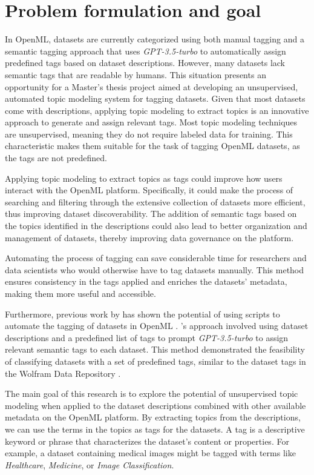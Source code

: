 \section{Problem formulation and goal}
In OpenML, datasets are currently categorized using both manual tagging and a semantic tagging approach that uses \textit{GPT-3.5-turbo} to automatically assign predefined tags based on dataset descriptions. However, many datasets lack semantic tags that are readable by humans. This situation presents an opportunity for a Master's thesis project aimed at developing an unsupervised, automated topic modeling system for tagging datasets. Given that most datasets come with descriptions, applying topic modeling to extract topics is an innovative approach to generate and assign relevant tags. Most topic modeling techniques are unsupervised, meaning they do not require labeled data for training. This characteristic makes them suitable for the task of tagging OpenML datasets, as the tags are not predefined.

Applying topic modeling to extract topics as tags could improve how users interact with the OpenML platform. Specifically, it could make the process of searching and filtering through the extensive collection of datasets more efficient, thus improving dataset discoverability. The addition of semantic tags based on the topics identified in the descriptions could also lead to better organization and management of datasets, thereby improving data governance on the platform.

Automating the process of tagging can save considerable time for researchers and data scientists who would otherwise have to tag datasets manually. This method ensures consistency in the tags applied and enriches the datasets' metadata, making them more useful and accessible.

Furthermore, previous work by \citeauthor{das_openmlscripts_nodate} has shown the potential of using scripts to automate the tagging of datasets in OpenML \cite{das_openmlscripts_nodate}. \citeauthor{das_openmlscripts_nodate}'s approach involved using dataset descriptions and a predefined list of tags to prompt \textit{GPT-3.5-turbo} to assign relevant semantic tags to each dataset. This method demonstrated the feasibility of classifying datasets with a set of predefined tags, similar to the dataset tags in the Wolfram Data Repository \cite{noauthor_wolfram_nodate}.

The main goal of this research is to explore the potential of unsupervised topic modeling when applied to the dataset descriptions combined with other available metadata on the OpenML platform. By extracting topics from the descriptions, we can use the terms in the topics as tags for the datasets. A tag is a descriptive keyword or phrase that characterizes the dataset's content or properties. For example, a dataset containing medical images might be tagged with terms like \textit{Healthcare}, \textit{Medicine}, or \textit{Image Classification}.

